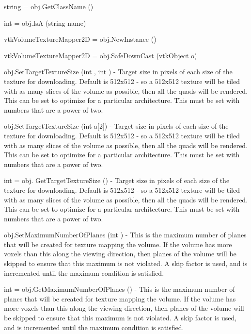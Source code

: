 \begin{DoxyItemize}
\item {\ttfamily string = obj.\-Get\-Class\-Name ()}  
\item {\ttfamily int = obj.\-Is\-A (string name)}  
\item {\ttfamily vtk\-Volume\-Texture\-Mapper2\-D = obj.\-New\-Instance ()}  
\item {\ttfamily vtk\-Volume\-Texture\-Mapper2\-D = obj.\-Safe\-Down\-Cast (vtk\-Object o)}  
\item {\ttfamily obj.\-Set\-Target\-Texture\-Size (int , int )} -\/ Target size in pixels of each size of the texture for downloading. Default is 512x512 -\/ so a 512x512 texture will be tiled with as many slices of the volume as possible, then all the quads will be rendered. This can be set to optimize for a particular architecture. This must be set with numbers that are a power of two.  
\item {\ttfamily obj.\-Set\-Target\-Texture\-Size (int a\mbox{[}2\mbox{]})} -\/ Target size in pixels of each size of the texture for downloading. Default is 512x512 -\/ so a 512x512 texture will be tiled with as many slices of the volume as possible, then all the quads will be rendered. This can be set to optimize for a particular architecture. This must be set with numbers that are a power of two.  
\item {\ttfamily int = obj. Get\-Target\-Texture\-Size ()} -\/ Target size in pixels of each size of the texture for downloading. Default is 512x512 -\/ so a 512x512 texture will be tiled with as many slices of the volume as possible, then all the quads will be rendered. This can be set to optimize for a particular architecture. This must be set with numbers that are a power of two.  
\item {\ttfamily obj.\-Set\-Maximum\-Number\-Of\-Planes (int )} -\/ This is the maximum number of planes that will be created for texture mapping the volume. If the volume has more voxels than this along the viewing direction, then planes of the volume will be skipped to ensure that this maximum is not violated. A skip factor is used, and is incremented until the maximum condition is satisfied.  
\item {\ttfamily int = obj.\-Get\-Maximum\-Number\-Of\-Planes ()} -\/ This is the maximum number of planes that will be created for texture mapping the volume. If the volume has more voxels than this along the viewing direction, then planes of the volume will be skipped to ensure that this maximum is not violated. A skip factor is used, and is incremented until the maximum condition is satisfied.  

\end{DoxyItemize}
